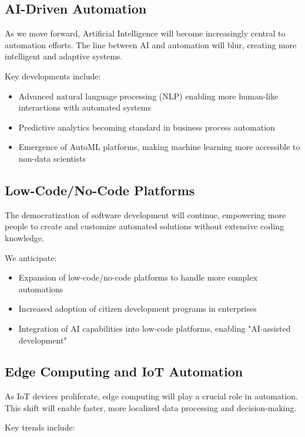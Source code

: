 \subsection{AI-Driven Automation}

As we move forward, Artificial Intelligence will become increasingly central to automation efforts. The line between AI and automation will blur, creating more intelligent and adaptive systems.

Key developments include:

\begin{itemize}
    \item Advanced natural language processing (NLP) enabling more human-like interactions with automated systems
    \item Predictive analytics becoming standard in business process automation
    \item Emergence of AutoML platforms, making machine learning more accessible to non-data scientists
\end{itemize}

\subsection{Low-Code/No-Code Platforms}

The democratization of software development will continue, empowering more people to create and customize automated solutions without extensive coding knowledge.

We anticipate:

\begin{itemize}
    \item Expansion of low-code/no-code platforms to handle more complex automations
    \item Increased adoption of citizen development programs in enterprises
    \item Integration of AI capabilities into low-code platforms, enabling "AI-assisted development"
\end{itemize}

\subsection{Edge Computing and IoT Automation}

As IoT devices proliferate, edge computing will play a crucial role in automation. This shift will enable faster, more localized data processing and decision-making.

Key trends include:

